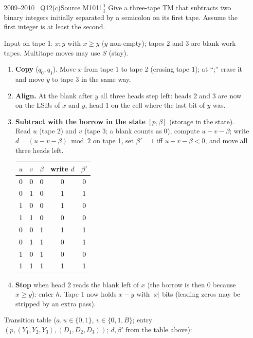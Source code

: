 \documentclass[11pt,a4paper]{article}
\begin{document}
\begin{question}{2009--2010 \textbullet\ Q12(c)}{Source M10}{11$\tfrac13$}
Give a three-tape TM that subtracts two binary integers initially separated by a semicolon on its first tape. Assume the first integer is at least the second.
\end{question}
\begin{solution}
Input on tape 1: $x;y$ with $x\ge y$ ($y$ non-empty); tapes 2 and 3 are blank work tapes. Multitape moves may use $S$ (stay).
\begin{enumerate}
\item \textbf{Copy} ($q_0,q_1$). Move $x$ from tape 1 to tape 2 (erasing tape 1); at ``;'' erase it and move $y$ to tape 3 in the same way.
\item \textbf{Align.} At the blank after $y$ all three heads step left: heads 2 and 3 are now on the LSBs of $x$ and $y$, head 1 on the cell where the last bit of $y$ was.
\item \textbf{Subtract with the borrow in the state} $[p,\beta]$ (storage in the state). Read $u$ (tape 2) and $v$ (tape 3; a blank counts as 0), compute $u-v-\beta$; write $d=(u-v-\beta)\bmod 2$ on tape 1, set $\beta'=1$ iff $u-v-\beta<0$, and move all three heads left.
\begin{center}\small\begin{tabular}{ccc|cc}\toprule $u$&$v$&$\beta$&write $d$&$\beta'$\\\midrule 0&0&0&0&0\\0&1&0&1&1\\1&0&0&1&0\\1&1&0&0&0\\0&0&1&1&1\\0&1&1&0&1\\1&0&1&0&0\\1&1&1&1&1\\\bottomrule\end{tabular}\end{center}
\item \textbf{Stop} when head 2 reads the blank left of $x$ (the borrow is then 0 because $x\ge y$): enter $h$. Tape 1 now holds $x-y$ with $|x|$ bits (leading zeros may be stripped by an extra pass).
\end{enumerate}
Transition table ($a,u\in\{0,1\}$, $v\in\{0,1,B\}$; entry $(p,(Y_1,Y_2,Y_3),(D_1,D_2,D_3))$; $d,\beta'$ from the table above):
\begin{center}\footnotesize\setlength{\tabcolsep}{3pt}\begin{tabular}{l|cccc}\toprule

\end{tabular}
\end{center}
\end{solution}
\end{document}
